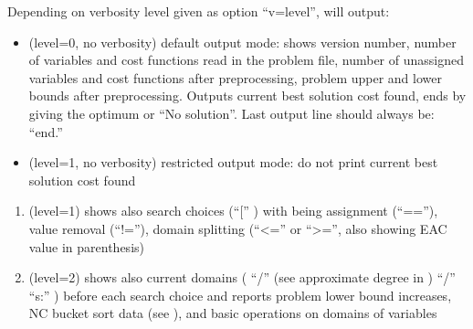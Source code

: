 \documentclass[letterpaper,10pt,openany,oneside,english]{sphinxmanual}
\begin{document}
\begin{fulllineitems}

\pysigstartsignatures
{}
\pysigstopsignatures
\sphinxAtStartPar
Depending on verbosity level given as option “\sphinxhyphen{}v=level”,  will output:\begin{itemize}
\item {} 
\sphinxAtStartPar
(level=0, no verbosity) default output mode: shows version number, number of variables and cost functions read in the problem file, number of unassigned variables and cost functions after preprocessing, problem upper and lower bounds after preprocessing. Outputs current best solution cost found, ends by giving the optimum or “No solution”. Last output line should always be: “end.”

\item {} 
\sphinxAtStartPar
(level=\sphinxhyphen{}1, no verbosity) restricted output mode: do not print current best solution cost found

\end{itemize}
\begin{enumerate}
%
\item {} 
\sphinxAtStartPar
(level=1) shows also search choices (“{[}”   \sphinxstyleemphasis{sum\_of\_current\_domain\_sizes”{]} Try”}   ) with  being assignment (“==”), value removal (“!=”), domain splitting (“\textless{}=” or “\textgreater{}=”, also showing EAC value in parenthesis)

\item {} 
\sphinxAtStartPar
(level=2) shows also current domains (  “/”  (see approximate degree in {\hyperref[\detokenize{ref/ref_modules:group__varelim}]{}}) “/”   “s:” ) before each search choice and reports problem lower bound increases, NC bucket sort data (see {\hyperref[\detokenize{ref/ref_modules:group__ncbucket}]{}}), and basic operations on domains of variables


\end{enumerate}
\end{fulllineitems}
\end{document}
